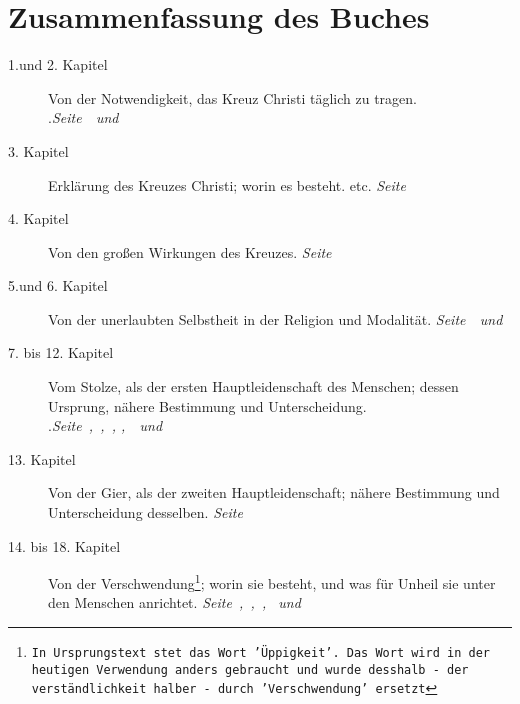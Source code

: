 \documentclass[a5paper,pagesize,9pt]{scrbook}
\begin{document}
\chapter{Zusammenfassung des Buches}
\begin{description}
\item[1.und 2. Kapitel] Von der Notwendigkeit, das Kreuz Christi täglich zu
tragen.\\
.\dotfill \textit{Seite~\pageref{kap1}~und~\pageref{kap2}}\\
\item[3. Kapitel] Erklärung des Kreuzes Christi; worin es besteht. etc.
\dotfill \textit{Seite~\pageref{kap3}}\\
\item[4. Kapitel] Von den großen Wirkungen des Kreuzes.
\dotfill \textit{Seite~\pageref{kap4}}\\
\item[5.und 6. Kapitel] Von der unerlaubten Selbstheit in der Religion und
Modalität.
\dotfill \textit{Seite~\pageref{kap5}~und~\pageref{kap6}}\\
\item[7. bis 12. Kapitel] Vom Stolze, als der ersten Hauptleidenschaft des
Menschen; dessen Ursprung, nähere Bestimmung und Unterscheidung.\\
.\dotfill \textit{Seite~\pageref{kap7},~\pageref{kap8},~\pageref{kap9}, \pageref{kap10},~\pageref{kap11}~und~\pageref{kap12}}\\
\item[13. Kapitel] Von der Gier, als der zweiten Hauptleidenschaft; nähere
Bestimmung und Unterscheidung desselben.
\dotfill \textit{Seite~\pageref{kap13}}\\
\item[14. bis 18. Kapitel] Von der Verschwendung\footnote{\texttt{In Ursprungstext stet
das Wort 'Üppigkeit'. Das Wort wird in der heutigen Verwendung anders
gebraucht und wurde desshalb - der verständlichkeit halber - durch
'Verschwendung' ersetzt}}; worin sie besteht, und was für Unheil sie unter den
Menschen anrichtet.
\dotfill \textit{Seite~\pageref{kap14},~\pageref{kap15},~\pageref{kap16},
\pageref{kap17}~und~\pageref{kap18}}\\
\end{description}

\end{document}
